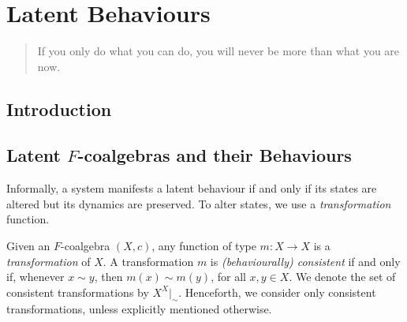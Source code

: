 

\chapter{Latent Behaviours} %
\label{ch:LatentBehaviours} %
\begin{quote}
If you only do what you can do, you will never be more than what you are now.
\end{quote}

\section{Introduction}
\section{Latent $F$-coalgebras and their Behaviours}
Informally, a system manifests a latent behaviour if and only if its states are altered but its dynamics are preserved. To alter states, we use a \emph{transformation} function.

\begin{definition}
Given an $F$-coalgebra $(X,c)$, any function of type $m\colon X\rightarrow X$ is a \emph{transformation} of $X$. %
A transformation $m$ is \emph{(behaviourally) consistent} if and only if, whenever $x\sim y$, then $m(x)\sim m(y)$, for all $x,y \in X$. We denote the set of consistent transformations by $X^X|_\sim$. Henceforth, we consider only consistent transformations, unless explicitly mentioned otherwise.
\end{definition}


